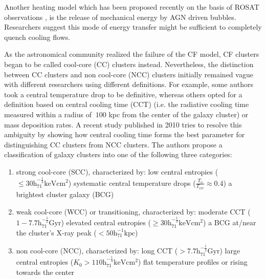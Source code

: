 \documentclass[a4paper]{article}
\begin{document}
        Another heating model which has been proposed recently on the basis of ROSAT observations \citep{Dunn2006, Birzan2004}, is the release of mechanical energy by AGN driven bubbles. Researchers suggest this mode of energy transfer might be sufficient to completely quench cooling flows. \\
        
        \par As the astronomical community realized the failure of the CF model, CF clusters began to be called cool-core (CC) clusters instead. Nevertheless, the distinction between CC clusters and non cool-core (NCC) clusters initially remained vague with different researchers using different definitions. For example, some authors took a central temperature drop to be definitive, whereas others opted for a definition based on central cooling time (CCT) (i.e. the radiative cooling time measured within a radius of $~100$ kpc from the center of the galaxy cluster)  or mass deposition rates. A recent study published in 2010 \citep{Hudson2010} tries to resolve this ambiguity by showing how central cooling time forms the best parameter for distinguishing CC clusters from NCC clusters. The authors propose a classification of galaxy clusters into one of the following three categories:
        
        \begin{enumerate}
            \item strong cool-core (SCC), characterized by:
                \subitem low central entropies ($\leq 30 \mathrm{h^{-\frac{1}{3}}_{71} keV cm^2}$)
                \subitem systematic central temperature drops ($\frac{T_o}{T_{vir}} \approx 0.4$)
                \subitem a brightest cluster galaxy (BCG)
            \item weak cool-core (WCC) or transitioning, characterized by:
                \subitem moderate CCT ($1 - 7.7 \mathrm{h^{-\frac{1}{2}}_{71} Gyr}$)
                \subitem elevated central entropies ($\geq 30 \mathrm{h^{-\frac{1}{3}}_{71} keV cm^2}$)
                \subitem a BCG at/near the cluster's X-ray peak ($< 50 \mathrm{h^{-1}_{71} kpc}$)
            \item non cool-core (NCC), characterized by:
                \subitem long CCT ($> 7.7 \mathrm{h^{-\frac{1}{2}}_{71} Gyr}$)
                \subitem large central entropies ($K_0 > 110 \mathrm{h^{-\frac{1}{3}}_{71} keV cm^2}$)
                \subitem flat temperature profiles or rising towards the center
        \end{enumerate}
    
\end{document}
